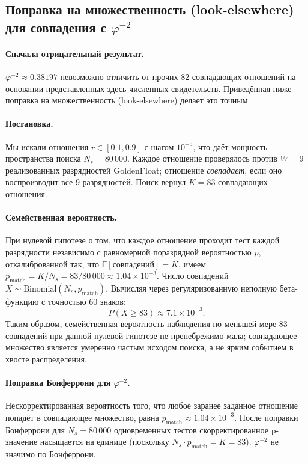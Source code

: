 \documentclass[11pt,a4paper]{article}
\theoremstyle{plain}
\begin{document}
\subsection{Поправка на множественность (look-elsewhere) для совпадения с \texorpdfstring{$\varphi^{-2}$}{phi^-2}}
\label{sec:lookelsewhere}

\paragraph{Сначала отрицательный результат.}
\(\varphi^{-2} \approx 0.38197\) невозможно отличить от прочих 82 совпадающих
отношений на основании представленных здесь численных свидетельств. Приведённая
ниже поправка на множественность (look-elsewhere) делает это точным.

\paragraph{Постановка.}
Мы искали отношения \(r \in [0.1, 0.9]\) с шагом \(10^{-5}\), что даёт мощность
пространства поиска \(N_s = 80\,000\). Каждое отношение проверялось против
\(W = 9\) реализованных разрядностей GoldenFloat; отношение \emph{совпадает},
если оно воспроизводит все 9 разрядностей. Поиск вернул \(K = 83\) совпадающих
отношения.

\paragraph{Семейственная вероятность.}
При нулевой гипотезе о том, что каждое отношение проходит тест каждой разрядности
независимо с равномерной поразрядной вероятностью \(p\), откалиброванной так,
что \(\mathbb{E}[\text{совпадений}] = K\), имеем
\(p_{\text{match}} = K/N_s = 83/80\,000 \approx 1.04 \times 10^{-3}\).
Число совпадений \(X \sim \mathrm{Binomial}(N_s, p_{\text{match}})\).
Вычисляя через регуляризованную неполную бета-функцию с точностью 60 знаков:
\[
P(X \ge 83) \approx 7.1 \times 10^{-3}.
\]
Таким образом, семейственная вероятность наблюдения по меньшей мере 83
совпадений при данной нулевой гипотезе не пренебрежимо мала; совпадающее
множество является умеренно частым исходом поиска, а не ярким событием в хвосте
распределения.

\paragraph{Поправка Бонферрони для \(\varphi^{-2}\).}
Нескорректированная вероятность того, что любое заранее заданное отношение
попадёт в совпадающее множество, равна
\(p_{\text{match}} \approx 1.04 \times 10^{-3}\).
После поправки Бонферрони для \(N_s = 80\,000\) одновременных тестов
скорректированное p-значение насыщается на единице (поскольку
\(N_s \cdot p_{\text{match}} = K = 83\)).
\(\varphi^{-2}\) не значимо по Бонферрони.
\end{document}

